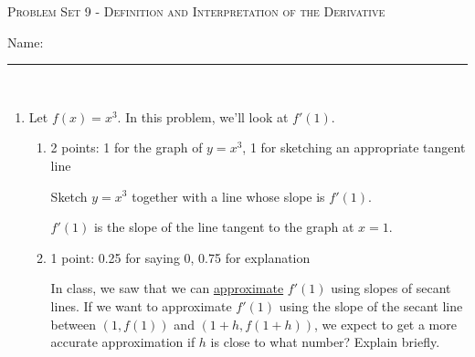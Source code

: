\documentclass{article}
\begin{document}
\begin{center}
  \large\textsc{Problem Set 9 - Definition and Interpretation of the Derivative}\\\vspace{.5in}
  \begin{problemonly}
   \large Name: \rule{5cm}{0.15mm}\\
   \end{problemonly}
\end{center}


\begin{enumerate}
\item Let $f(x) = x^3$. In this problem, we'll look at $f'(1)$.

  \begin{enumerate}
  \item

    \begin{grading}
      2 points: 1 for the graph of $y = x^3$, 1 for sketching an appropriate tangent line 
    \end{grading}

    \begin{problem}[\stretch{1.25}]
      Sketch $y = x^3$ together with a line whose slope is $f'(1)$.
    \end{problem}

    \begin{solution}
      $f'(1)$ is the slope of the line tangent to the graph at $x=1$. 
      
    \end{solution}

  \item \label{approximate-derivative-values-of-h}

    \begin{grading}
      1 point: 0.25 for saying 0, 0.75 for explanation 
    \end{grading}

    \begin{problem}[0.75in]
      In class, we saw that we can \uline{approximate} $f'(1)$ using slopes of secant lines. If we want to approximate $f'(1)$ using the slope of the secant line between $(1, f(1))$ and $(1 + h, f(1 + h))$, we expect to get a more accurate approximation if $h$ is close to what number? Explain briefly.
    \end{problem}


\end{enumerate}
\end{enumerate}
\end{document}
